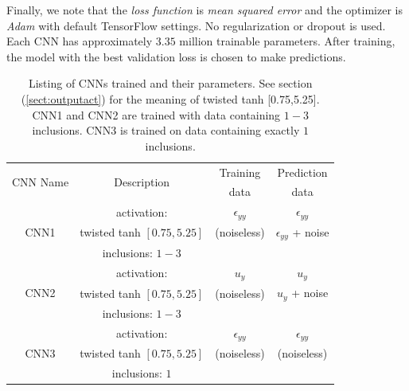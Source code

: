 \documentclass[12pt]{article}
\begin{document}
Finally, we note that the \textit{loss function} is \textit{mean squared error} and the optimizer is \textit{Adam} \cite{misc:kingma2017adam} with default TensorFlow settings. No regularization or dropout is used.  Each CNN has approximately $3.35$ million trainable parameters. After training, the model with the best validation loss is chosen to make predictions.
%
\begin{center}
\begin{table}
  \centering
  \begin{tabular}{|c|c|c|c|}
    \hline
    \multirow{2}{*}{CNN Name} & \multirow{2}{*}{Description} & Training    & Prediction \\
                              &                              & data        & data \\
     \hline
     \multirow{3}{*}{CNN1}    & {activation:  }                    & {$\epsilon_{yy}$}                 &  $\epsilon_{yy}$\\
                              & twisted tanh $[0.75,5.25]$         &  (noiseless)                     & $\epsilon_{yy}$ + noise\\
                              & {inclusions: $1-3$}                &                                  &\\
     \hline
     \multirow{3}{*}{CNN2}    & {activation: }                     & {$u_{y}$}                         & $u_{y}$\\
                              & twisted tanh $[0.75,5.25]$         & (noiseless)                      & $u_{y}$ + noise\\
                              & {inclusions: $1-3$}                &                                  &\\  
     \hline
     \multirow{3}{*}{CNN3}    & {activation:}                      & {$\epsilon_{yy}$}                 & {$\epsilon_{yy}$}\\
                              & twisted tanh $[0.75,5.25]$         & (noiseless)                      & (noiseless)\\
                              & {inclusions: $1$}                  &                                  & \\

    \hline
  \end{tabular}
  \caption{\label{table:cnnparams} Listing of CNNs trained and their parameters. See section (\ref{sect:outputact}) for the meaning of twisted tanh [0.75,5.25]. CNN1 and CNN2 are trained with data containing $1-3$ inclusions. CNN3 is trained on data containing exactly $1$ inclusions.}
\end{table}
\end{center}
%
\end{document}

